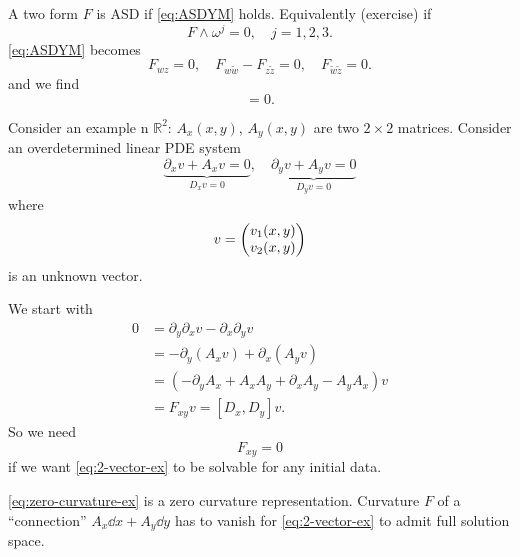 \documentclass[a4paper,11pt]{article}
\begin{document}
    A two form $F$ is ASD if \eqref{eq:ASDYM} holds. Equivalently (exercise) if 
    \begin{equation}
        F \wedge \omega^j = 0, \quad j = 1,2,3.
    \end{equation}
    \eqref{eq:ASDYM} becomes 
    \begin{equation}
        F_{wz} = 0, \quad F_{w \tilde w} - F_{z \tilde z} = 0, \quad F_{\tilde w \tilde z} = 0 \label{eq:complex-ASD}.
    \end{equation}
    and we find
    \begin{equation}
        [D_w, D_z] = 0.
    \end{equation}


    \begin{aside}
    Consider an example n $\mathbb{R}^2$: $A_x(x,y)$, $A_y(x,y)$ are two $2\times 2$ matrices. Consider an overdetermined linear PDE system 
    \begin{equation}
        \underbrace{\partial_x v + A_x v = 0}_{D_x v = 0}, \quad \underbrace{\partial_y v + A_y v = 0}_{D_y v = 0} \label{eq:2-vector-ex}
    \end{equation}
    where  
    \begin{equation}
        v = \mqty(v_1(x,y)\\v_2(x,y))
    \end{equation}
    is an unknown vector. 
    
    We start with 
    \begin{equation}
        \begin{split}
            0 & = \partial_y \partial_x v - \partial_x \partial_y v\\
            & = - \partial_y \left( A_x v \right) + \partial_x \left( A_y v \right)\\
            & = \left( - \partial_y A_x + A_x A_y + \partial_x A_y - A_y A_x \right) v\\
            & = F_{xy} v = [D_x, D_y] v.
        \end{split}
    \end{equation}
    So we need 
    \begin{equation}
        \boxed{F_{xy} = 0} \label{eq:zero-curvature-ex}
    \end{equation}
    if we want \eqref{eq:2-vector-ex} to be solvable for any initial data.

    \eqref{eq:zero-curvature-ex} is a zero curvature representation. Curvature $F$ of a ``connection'' $A_x \dd{x} + A_y \dd{y}$ has to vanish for \eqref{eq:2-vector-ex} to admit full solution space.


\end{aside}
\end{document}
